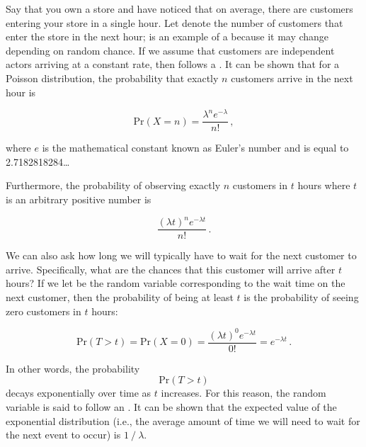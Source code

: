 Say that you own a store and have noticed that on average, there are  customers entering your store in a single hour. Let  denote the number of customers that enter the store in the next hour;  is an example of a  because it may change depending on random chance. If we assume that customers are independent actors arriving at a constant rate, then  follows a . It can be shown that for a Poisson distribution, the probability that exactly $n$ customers arrive in the next hour is

$$\mathrm{Pr}(X = n) = \frac{\lambda^n e^{-\lambda}}{n!}\,,$$

where $e$ is the mathematical constant known as Euler's number and is equal to 2.7182818284…\\

\begin{note}\end{note}

Furthermore, the probability of observing exactly $n$ customers in $t$ hours where $t$ is an arbitrary positive number is

$$\frac{(\lambda t)^n e^{-\lambda t}}{n!}\,.$$

We can also ask how long we will typically have to wait for the next customer to arrive. Specifically, what are the chances that this customer will arrive after $t$ hours? If we let  be the random variable corresponding to the wait time on the next customer, then the probability of  being at least $t$ is the probability of seeing zero customers in $t$ hours:

$$\mathrm{Pr}(T > t) = \mathrm{Pr}(X = 0) = \frac{(\lambda t)^0 e^{-\lambda t}}{0!} = e^{-\lambda t}\,.$$

In other words, the probability $$\mathrm{Pr}(T > t)$$ decays exponentially over time as $t$ increases. For this reason, the random variable  is said to follow an . It can be shown that the expected value of the exponential distribution (i.e., the average amount of time we will need to wait for the next event to occur) is $1\mathbin{/}\lambda$.\\

